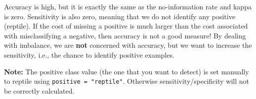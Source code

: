 \documentclass[
  notitlepage]{book}
\newenvironment{Shaded}{\begin{snugshade}}{\end{snugshade}}
\newcommand{\CommentTok}[1]{\textcolor[rgb]{0.56,0.35,0.01}{\textit{#1}}}
\newcommand{\DataTypeTok}[1]{\textcolor[rgb]{0.13,0.29,0.53}{#1}}
\newcommand{\KeywordTok}[1]{\textcolor[rgb]{0.13,0.29,0.53}{\textbf{#1}}}
\newcommand{\NormalTok}[1]{#1}
\newcommand{\OperatorTok}[1]{\textcolor[rgb]{0.81,0.36,0.00}{\textbf{#1}}}
\newcommand{\StringTok}[1]{\textcolor[rgb]{0.31,0.60,0.02}{#1}}
\begin{document}
\begin{Shaded}
\end{Shaded}

Accuracy is high, but it is exactly the same as the no-information rate
and kappa is zero. Sensitivity is also zero, meaning that we do not
identify any positive (reptile). If the cost of missing a positive is
much larger than the cost associated with misclassifying a negative,
then accuracy is not a good measure! By dealing with imbalance, we are
\textbf{not} concerned with accuracy, but we want to increase the
sensitivity, i.e., the chance to identify positive examples.

\textbf{Note:} The positive class value (the one that you want to detect) is
set manually to reptile using \texttt{positive\ =\ "reptile"}. Otherwise
sensitivity/specificity will not be correctly calculated.
\end{document}
